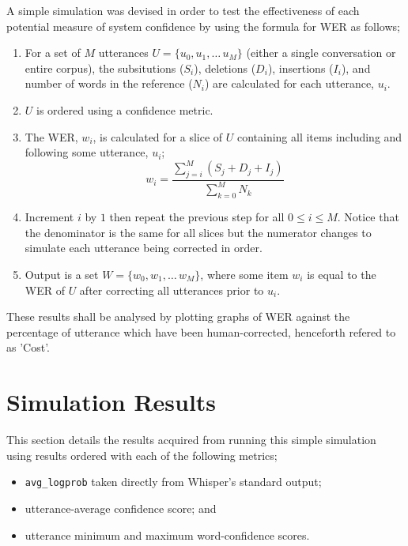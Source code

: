 A simple simulation was devised in order to test the effectiveness of each potential measure of system confidence by using the formula for WER as follows;

\begin{enumerate}
  \item For a set of $M$ utterances $U = \{ u_{0}, u_{1}, \ldots\, u_{M} \}$ (either a single conversation or entire corpus), the subsitutions ($S_i$), deletions ($D_i$), insertions ($I_i$), and number of words in the reference ($N_i$) are calculated for each utterance, $u_i$.
  \item $U$ is ordered using a confidence metric.
  \item The WER, $w_i$, is calculated for a slice of $U$ containing all items including and following some utterance, $u_i$;
    \[
      w_i = \frac{\sum_{j=i}^{M} (S_j + D_j + I_j)}{\sum_{k=0}^{M} N_k}
    \]
  \item Increment $i$ by $1$ then repeat the previous step for all $0 \leq i \leq M$.
    Notice that the denominator is the same for all slices but the numerator changes to simulate each utterance being corrected in order.
  \item Output is a set $W = \{ w_{0}, w_{1}, \ldots\, w_{M} \}$, where some item $w_{i}$ is equal to the WER of $U$ after correcting all utterances prior to $u_i$.
\end{enumerate}

These results shall be analysed by plotting graphs of WER against the percentage of utterance which have been human-corrected, henceforth refered to as 'Cost'.

\section{Simulation Results}

This section details the results acquired from running this simple simulation using results ordered with each of the following metrics;

\begin{itemize}
  \item \texttt{avg\_logprob} taken directly from Whisper's standard output;
  \item utterance-average confidence score; and
  \item utterance minimum and maximum word-confidence scores.
\end{itemize}

